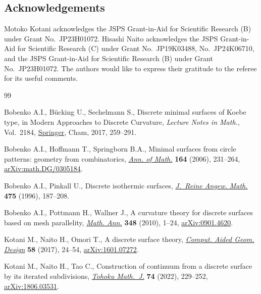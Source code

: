 \documentclass[pdftex]{sigma}
\newcommand{\1}{{\bf 1}}
\numberwithin{equation}{section}
\begin{document}
\subsection*{Acknowledgements}
Motoko Kotani acknowledges the JSPS Grant-in-Aid for Scientific Research (B) under Grant No.~JP23H01072.
Hisashi Naito acknowledges the JSPS Grant-in-Aid for Scientific Research (C) under Grant No.~JP19K03488, No.~JP24K06710, and
the JSPS Grant-in-Aid for Scientific Research (B) under Grant No.~JP23H01072.
The authors would like to express their gratitude to the referee for its useful comments.

\begin{thebibliography}{99}
\footnotesize\itemsep=0pt

Bobenko A.I., B\"ucking U., Sechelmann S., Discrete minimal surfaces of {K}oebe
  type, in Modern {A}pproaches to {D}iscrete {C}urvature, \textit{Lecture Notes
  in Math.}, Vol.~2184,  \href{https://doi.org/10.1007/978-3-319-58002-9_8}{Springer}, Cham, 2017, 259--291.

Bobenko A.I., Hoffmann T., Springborn B.A., Minimal surfaces from circle
  patterns: geometry from combinatorics, \href{https://doi.org/10.4007/annals.2006.164.231}{\textit{Ann. of Math.}} \textbf{164}
  (2006), 231--264, \href{https://arxiv.org/abs/math.DG/0305184}{arXiv:math.DG/0305184}.

Bobenko A.I., Pinkall U., Discrete isothermic surfaces,  \href{https://doi.org/10.1515/crll.1996.475.187}{\textit{J.~Reine Angew.
  Math.}} \textbf{475} (1996), 187--208.

Bobenko A.I., Pottmann H., Wallner J., A curvature theory for discrete surfaces
  based on mesh parallelity,  \href{https://doi.org/10.1007/s00208-009-0467-9}{\textit{Math. Ann.}} \textbf{348} (2010), 1--24,
  \href{https://arxiv.org/abs/0901.4620}{arXiv:0901.4620}.

Kotani M., Naito H., Omori T., A discrete surface theory, \href{https://doi.org/10.1016/j.cagd.2017.09.002}{\textit{Comput. Aided
  Geom. Design}} \textbf{58} (2017), 24--54, \href{https://arxiv.org/abs/1601.07272}{arXiv:1601.07272}.

Kotani M., Naito H., Tao C., Construction of continuum from a discrete surface
  by its iterated subdivisions, \href{https://doi.org/10.2748/tmj.20201225}{\textit{Tohoku Math.~J.}} \textbf{74} (2022),
  229--252, \href{https://arxiv.org/abs/1806.03531}{arXiv:1806.03531}.


\end{thebibliography}
\end{document}
